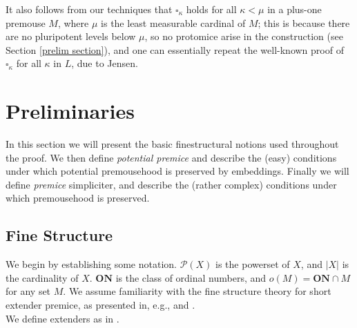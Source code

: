 \documentclass[12pt]{article}
\begin{document}
It also follows from our techniques that $\square_\kappa$ holds for all $\kappa < \mu$ in a plus-one premouse $M$, where $\mu$ is the least measurable cardinal of $M$; this is because there are no pluripotent levels below $\mu$, so no protomice arise in the construction (see Section \ref{prelim section}), and one can essentially repeat the well-known proof of $\square_\kappa$ for all $\kappa$ in $L$, due to Jensen.\\

\section{Preliminaries}

In this section we will present the basic finestructural notions used throughout the proof.  We then define \textit{potential premice} and describe the (easy) conditions under which potential premousehood is preserved by embeddings.  Finally we will define \textit{premice} simpliciter, and describe the (rather complex) conditions under which premousehood is preserved.\\

\subsection{Fine Structure}

We begin by establishing some notation.  $\mathcal{P}(X)$ is the powerset of $X$, and $|X|$ is the cardinality of $X$.  $\textbf{ON}$ is the class of ordinal numbers, and $o(M) = \textbf{ON} \cap M$ for any set $M$.  We assume familiarity with the fine structure theory for short extender premice, as presented in, e.g., \cite{zeman book} and \cite{ZS finestructure}.\\

 We define extenders as in \cite{ZS finestructure}.\\
 
\end{document}
